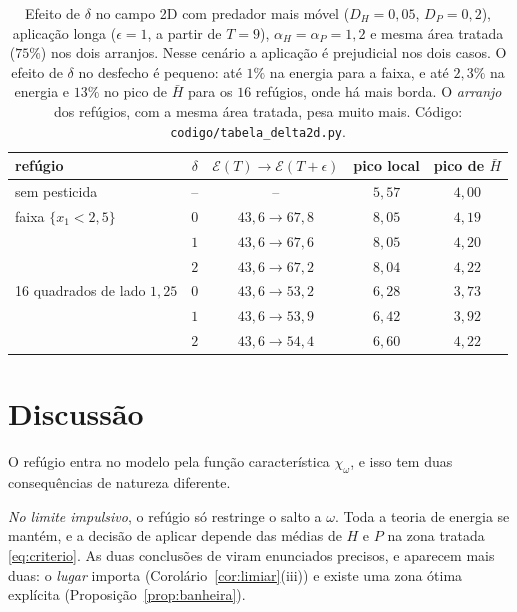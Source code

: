 \documentclass[11pt,a4paper]{article}
\numberwithin{equation}{section}
\theoremstyle{definition}
\theoremstyle{remark}
\newcommand{\E}{\mathcal{E}}
\begin{document}
\begin{table}[ht]
\centering\small
\begin{tabular}{lcccc}
\toprule
refúgio & $\delta$ & $\E(T)\to\E(T+\epsilon)$ & pico local & pico de $\bar H$ \\
\midrule
sem pesticida & -- & -- & $5{,}57$ & $4{,}00$\\
faixa $\{x_1<2{,}5\}$ & $0$ & $43{,}6\to67{,}8$ & $8{,}05$ & $4{,}19$\\
 & $1$ & $43{,}6\to67{,}6$ & $8{,}05$ & $4{,}20$\\
 & $2$ & $43{,}6\to67{,}2$ & $8{,}04$ & $4{,}22$\\
16 quadrados de lado $1{,}25$ & $0$ & $43{,}6\to53{,}2$ & $6{,}28$ & $3{,}73$\\
 & $1$ & $43{,}6\to53{,}9$ & $6{,}42$ & $3{,}92$\\
 & $2$ & $43{,}6\to54{,}4$ & $6{,}60$ & $4{,}22$\\
\bottomrule
\end{tabular}
\caption{Efeito de $\delta$ no campo 2D com predador mais móvel ($D_H=0{,}05$, $D_P=0{,}2$), aplicação longa
($\epsilon=1$, a partir de $T=9$), $\alpha_H=\alpha_P=1{,}2$ e mesma área tratada ($75\%$) nos dois arranjos.
Nesse cenário a aplicação é prejudicial nos dois casos. O efeito de $\delta$ no desfecho é pequeno: até
$1\%$ na energia para a faixa, e até $2{,}3\%$ na energia e $13\%$ no pico de $\bar H$ para os $16$ refúgios,
onde há mais borda. O \emph{arranjo} dos refúgios, com a mesma área tratada, pesa muito mais. Código:
\texttt{codigo/tabela\_delta2d.py}.}
\label{tab:delta2d}
\end{table}

\clearpage
\section{Discussão}

O refúgio entra no modelo pela função característica $\chi_\omega$, e isso tem duas
consequências de natureza diferente.

\emph{No limite impulsivo}, o refúgio só restringe o salto a $\omega$. Toda a teoria de energia se
mantém, e a decisão de aplicar depende das médias de $H$ e $P$ na zona tratada \eqref{eq:criterio}.
As duas conclusões de \cite{LiYang} viram enunciados precisos, e aparecem mais duas: o \emph{lugar}
importa (Corolário~\ref{cor:limiar}(iii)) e existe uma zona ótima explícita
(Proposição~\ref{prop:banheira}).
\end{document}

